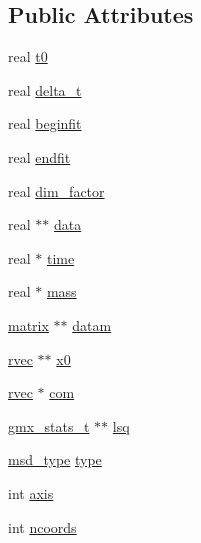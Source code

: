 \subsection*{\-Public \-Attributes}
\begin{DoxyCompactItemize}
\item 
real \hyperlink{structt__corr_a47fc3261613b2ea06a74faf544334dfb}{t0}
\item 
real \hyperlink{structt__corr_a5c53b3192274fffe11f64414764c3155}{delta\-\_\-t}
\item 
real \hyperlink{structt__corr_aaa5b4129fe078f777e1bbc6f052d1e76}{beginfit}
\item 
real \hyperlink{structt__corr_aba30a45ed630251e4ad996411568cf95}{endfit}
\item 
real \hyperlink{structt__corr_acc89850cecb37d301e482dd23d67735f}{dim\-\_\-factor}
\item 
real $\ast$$\ast$ \hyperlink{structt__corr_adaa8f1a191634190366239ec504f2b2e}{data}
\item 
real $\ast$ \hyperlink{structt__corr_ab3d439164a49c8e3818cca0bcd3877bf}{time}
\item 
real $\ast$ \hyperlink{structt__corr_ab4527ac5deb1d5cf9be2a6cf0e65a154}{mass}
\item 
\hyperlink{share_2template_2gromacs_2types_2simple_8h_a7ea9c2a830d3f743b887387e33645a83}{matrix} $\ast$$\ast$ \hyperlink{structt__corr_a44bf948e74d6e900e75c5dadcc524572}{datam}
\item 
\hyperlink{share_2template_2gromacs_2types_2simple_8h_aa02a552a4abd2f180c282a083dc3a999}{rvec} $\ast$$\ast$ \hyperlink{structt__corr_a39860b3edc3dd3acdc5f1be59bd33f08}{x0}
\item 
\hyperlink{share_2template_2gromacs_2types_2simple_8h_aa02a552a4abd2f180c282a083dc3a999}{rvec} $\ast$ \hyperlink{structt__corr_a34d81b0c622385f030f1d4e7613072db}{com}
\item 
\hyperlink{include_2gmx__statistics_8h_aa68b9ba721d47f4544247754867b7f92}{gmx\-\_\-stats\-\_\-t} $\ast$$\ast$ \hyperlink{structt__corr_af1a27e968064678433c1321e07a15241}{lsq}
\item 
\hyperlink{gmx__msd_8c_a28f509c98768c415ddbafa95fa0543f9}{msd\-\_\-type} \hyperlink{structt__corr_a0dbb7cd61eb8386ffcd43a4f71834f14}{type}
\item 
int \hyperlink{structt__corr_a4124143de7c6b7c03a04806bde19bcd0}{axis}
\item 
int \hyperlink{structt__corr_a1786ab1871fb36c447e7eeeca3785634}{ncoords}
\item 

\end{DoxyCompactItemize}
